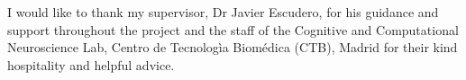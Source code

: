 \begin{acknowledgements}

I would like to thank my supervisor, Dr Javier Escudero, for his guidance and support throughout the project and the staff of the Cognitive and Computational Neuroscience Lab, Centro de Tecnolog\`{i}a Biom\'{e}dica (CTB), Madrid for their kind hospitality and helpful advice. 


\end{acknowledgements}
